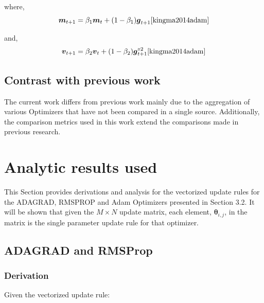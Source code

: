 \documentclass{article}
\begin{document}
where,
\begin{equation}
\boldsymbol{m}_{t+1} = \beta_1\boldsymbol{m}_{t} + (1-\beta_1)\boldsymbol{g}_{t+1}
\cite{kingma2014adam}
\end{equation}

and,
\begin{equation}
\boldsymbol{v}_{t+1} = \beta_2\boldsymbol{v}_{t} + (1-\beta_2)\boldsymbol{g}_{t+1}^{\circ2}
\cite{kingma2014adam}
\end{equation}
\subsection{Contrast with previous work}

The current work differs from previous work mainly due to the aggregation of various Optimizers that have not been compared in a single source. Additionally, the comparison metrics used in this work extend the comparisons made in previous research. 

\section{Analytic results used}
This Section provides derivations and analysis for the vectorized update rules for the ADAGRAD, RMSPROP and Adam Optimizers presented in Section 3.2. It will be shown that given the $M \times N$ update matrix, each element, $\boldsymbol{\theta}_{i,j}$,  in the matrix is the single parameter update rule for that optimizer.

\subsection{ADAGRAD and RMSProp}
\subsubsection{Derivation}
Given the vectorized update rule: \hfill\newline
\end{document}
